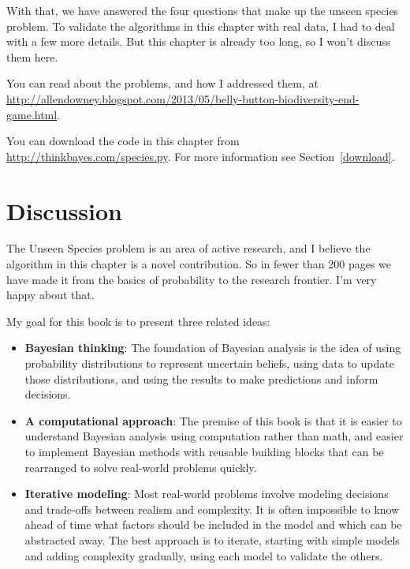 \documentclass[12pt]{book}
\begin{document}
With that, we have answered the four questions that make up the unseen
species problem.  To validate the algorithms in this chapter with
real data, I had to deal with a few more details.  But
this chapter is already too long, so I won't discuss them here.

You can read about the problems, and how I addressed them, at
\url{http://allendowney.blogspot.com/2013/05/belly-button-biodiversity-end-game.html}.

You can download the code in this chapter from
\url{http://thinkbayes.com/species.py}.
  For more information
see Section~\ref{download}.


\section{Discussion}

The Unseen Species problem is an area of active research, and I
believe the algorithm in this chapter is a novel contribution.  So in
fewer than 200 pages we have made it from the basics of probability to
the research frontier.  I'm very happy about that.

My goal for this book is to present three related ideas:

\begin{itemize}

\item {\bf Bayesian thinking}: The foundation of Bayesian analysis is
  the idea of using probability distributions to represent uncertain
  beliefs, using data to update those distributions, and using the
  results to make predictions and inform decisions.

\item {\bf A computational approach}: The premise of this book is that
  it is easier to understand Bayesian analysis using computation
  rather than math, and easier to implement Bayesian methods with
  reusable building blocks that can be rearranged to solve real-world
  problems quickly.

\item {\bf Iterative modeling}: Most real-world problems involve
  modeling decisions and trade-offs between realism and complexity.
  It is often impossible to know ahead of time what factors should be
  included in the model and which can be abstracted away.  The best
  approach is to iterate, starting with simple models and adding
  complexity gradually, using each model to validate the others.

\end{itemize}
\end{document}
